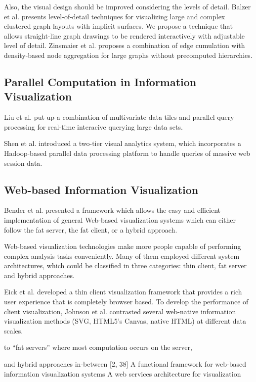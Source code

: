 \documentclass{article}
\begin{document}
Also, the visual design should be improved considering the levels of detail.
Balzer et al.\cite{balzer2007level} presents level-of-detail techniques for visualizing large and complex clustered graph layouts with implicit surfaces.
We propose a technique that allows straight-line graph drawings to be rendered interactively with adjustable level of detail.
Zinsmaier et al.\cite{zinsmaier2012interactive} proposes a combination of edge cumulation with density-based node aggregation for large graphs without precomputed hierarchies.


\subsection{Parallel Computation in Information Visualization}


Liu et al.\cite{liu2013immens} put up a combination of multivariate data tiles and parallel query processing for real-time interacive querying large data sets.


Shen et al.\cite{shen2012visual} introduced a two-tier visual analytics system, which incorporates a Hadoop-based parallel data processing platform to handle queries of massive web session data.
\subsection{Web-based Information Visualization}


Bender et al.\cite{bender2000functional} presented a framework which allows the easy and efficient implementation of general Web-based visualization systems which can either follow the fat server, the fat client, or a hybrid approach.


Web-based visualization technologies make more people capable of performing complex analysis tasks conveniently. Many of them employed different system architectures, which could be classified in three categories\cite{bostock2009protovis}: thin client, fat server and hybrid approaches.

 Eick et al.\cite{eick2007thin} developed a thin client visualization framework that provides a rich user experience that is completely browser based.
 To develop the performance of client visualization, Johnson et al.\cite{johnson2008scalability} contrasted several web-native information visualization methods (SVG, HTML5's Canvas, native HTML) at different data scales.
 
 
to “fat servers” where most computation occurs on the server,

 and hybrid approaches in-between [2, 38]
A functional framework for web-based information visualization systems
A web services architecture for visualization






\end{document}
